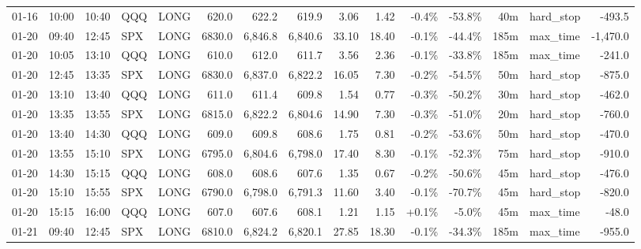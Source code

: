 \documentclass[11pt,a4paper,twoside]{article}
\begin{document}
\begin{landscape}
\begin{center}
\begin{longtable}{>{\color{txtmain}}l l l l l r r r r r r r r >{\color{txtmain}}l r}
01-16 & 10:00 & 10:40 & QQQ & LONG & 620.0 & 622.2 & 619.9 & 3.06 & 1.42 & \textcolor{lossred}{-0.4\%} & \textcolor{lossred}{-53.8\%} & 40m & hard\_stop & \textcolor{lossred}{-493.5} \\
01-20 & 09:40 & 12:45 & SPX & LONG & 6830.0 & 6,846.8 & 6,840.6 & 33.10 & 18.40 & \textcolor{lossred}{-0.1\%} & \textcolor{lossred}{-44.4\%} & 185m & max\_time & \textcolor{lossred}{-1,470.0} \\
01-20 & 10:05 & 13:10 & QQQ & LONG & 610.0 & 612.0 & 611.7 & 3.56 & 2.36 & \textcolor{lossred}{-0.1\%} & \textcolor{lossred}{-33.8\%} & 185m & max\_time & \textcolor{lossred}{-241.0} \\
01-20 & 12:45 & 13:35 & SPX & LONG & 6830.0 & 6,837.0 & 6,822.2 & 16.05 & 7.30 & \textcolor{lossred}{-0.2\%} & \textcolor{lossred}{-54.5\%} & 50m & hard\_stop & \textcolor{lossred}{-875.0} \\
01-20 & 13:10 & 13:40 & QQQ & LONG & 611.0 & 611.4 & 609.8 & 1.54 & 0.77 & \textcolor{lossred}{-0.3\%} & \textcolor{lossred}{-50.2\%} & 30m & hard\_stop & \textcolor{lossred}{-462.0} \\
01-20 & 13:35 & 13:55 & SPX & LONG & 6815.0 & 6,822.2 & 6,804.6 & 14.90 & 7.30 & \textcolor{lossred}{-0.3\%} & \textcolor{lossred}{-51.0\%} & 20m & hard\_stop & \textcolor{lossred}{-760.0} \\
01-20 & 13:40 & 14:30 & QQQ & LONG & 609.0 & 609.8 & 608.6 & 1.75 & 0.81 & \textcolor{lossred}{-0.2\%} & \textcolor{lossred}{-53.6\%} & 50m & hard\_stop & \textcolor{lossred}{-470.0} \\
01-20 & 13:55 & 15:10 & SPX & LONG & 6795.0 & 6,804.6 & 6,798.0 & 17.40 & 8.30 & \textcolor{lossred}{-0.1\%} & \textcolor{lossred}{-52.3\%} & 75m & hard\_stop & \textcolor{lossred}{-910.0} \\
01-20 & 14:30 & 15:15 & QQQ & LONG & 608.0 & 608.6 & 607.6 & 1.35 & 0.67 & \textcolor{lossred}{-0.2\%} & \textcolor{lossred}{-50.6\%} & 45m & hard\_stop & \textcolor{lossred}{-476.0} \\
01-20 & 15:10 & 15:55 & SPX & LONG & 6790.0 & 6,798.0 & 6,791.3 & 11.60 & 3.40 & \textcolor{lossred}{-0.1\%} & \textcolor{lossred}{-70.7\%} & 45m & hard\_stop & \textcolor{lossred}{-820.0} \\
01-20 & 15:15 & 16:00 & QQQ & LONG & 607.0 & 607.6 & 608.1 & 1.21 & 1.15 & \textcolor{wingreen}{+0.1\%} & \textcolor{lossred}{-5.0\%} & 45m & max\_time & \textcolor{lossred}{-48.0} \\
01-21 & 09:40 & 12:45 & SPX & LONG & 6810.0 & 6,824.2 & 6,820.1 & 27.85 & 18.30 & \textcolor{lossred}{-0.1\%} & \textcolor{lossred}{-34.3\%} & 185m & max\_time & \textcolor{lossred}{-955.0} \\

\end{longtable}
\end{center}
\end{landscape}
\end{document}

